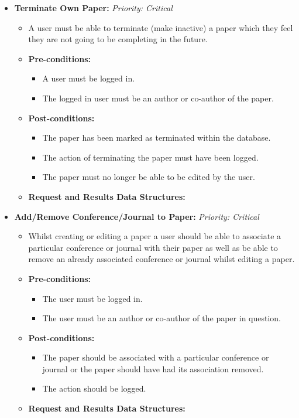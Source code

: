 \documentclass{article}
\begin{document}
\begin{itemize}
					\item \textbf{Terminate Own Paper:} \hfill \textit{Priority: Critical}
					\begin{itemize}
						\item A user must be able to terminate (make inactive) a paper which they feel they are not going to be completing in the future.
						\item \textbf{Pre-conditions:}
						\begin{itemize}
							\item A user must be logged in.
							\item The logged in user must be an author or co-author of the paper.
						\end{itemize}
						\item \textbf{Post-conditions:}
						\begin{itemize}
							\item The paper has been marked as terminated within the database.
							\item The action of terminating the paper must have been logged.
							\item The paper must no longer be able to be edited by the user.
						\end{itemize}
						\item \textbf{Request and Results Data Structures:}
					\end{itemize}
					
					\item \textbf{Add/Remove Conference/Journal to Paper:} \hfill \textit{Priority: Critical}
					\begin{itemize}
						\item Whilst creating or editing a paper a user should be able to associate a particular conference or journal with their paper as well as be able to remove an already associated conference or journal whilst editing a paper.
						\item \textbf{Pre-conditions:}
						\begin{itemize}
							\item The user must be logged in.
							\item The user must be an author or co-author of the paper in question.
						\end{itemize}
						\item \textbf{Post-conditions:}
						\begin{itemize}
							\item The paper should be associated with a particular conference or journal or the paper should have had its association removed.
							\item The action should be logged.
						\end{itemize}
						\item \textbf{Request and Results Data Structures:}
					\end{itemize}					
					

\end{itemize}
\end{document}
